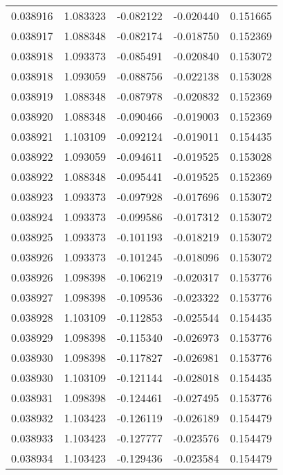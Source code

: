 \begin{tabular}{lrrrr}
0.038916    &  1.083323 & -0.082122 & -0.020440 &             0.151665 \\
0.038917    &  1.088348 & -0.082174 & -0.018750 &             0.152369 \\
0.038918    &  1.093373 & -0.085491 & -0.020840 &             0.153072 \\
0.038918    &  1.093059 & -0.088756 & -0.022138 &             0.153028 \\
0.038919    &  1.088348 & -0.087978 & -0.020832 &             0.152369 \\
0.038920    &  1.088348 & -0.090466 & -0.019003 &             0.152369 \\
0.038921    &  1.103109 & -0.092124 & -0.019011 &             0.154435 \\
0.038922    &  1.093059 & -0.094611 & -0.019525 &             0.153028 \\
0.038922    &  1.088348 & -0.095441 & -0.019525 &             0.152369 \\
0.038923    &  1.093373 & -0.097928 & -0.017696 &             0.153072 \\
0.038924    &  1.093373 & -0.099586 & -0.017312 &             0.153072 \\
0.038925    &  1.093373 & -0.101193 & -0.018219 &             0.153072 \\
0.038926    &  1.093373 & -0.101245 & -0.018096 &             0.153072 \\
0.038926    &  1.098398 & -0.106219 & -0.020317 &             0.153776 \\
0.038927    &  1.098398 & -0.109536 & -0.023322 &             0.153776 \\
0.038928    &  1.103109 & -0.112853 & -0.025544 &             0.154435 \\
0.038929    &  1.098398 & -0.115340 & -0.026973 &             0.153776 \\
0.038930    &  1.098398 & -0.117827 & -0.026981 &             0.153776 \\
0.038930    &  1.103109 & -0.121144 & -0.028018 &             0.154435 \\
0.038931    &  1.098398 & -0.124461 & -0.027495 &             0.153776 \\
0.038932    &  1.103423 & -0.126119 & -0.026189 &             0.154479 \\
0.038933    &  1.103423 & -0.127777 & -0.023576 &             0.154479 \\
0.038934    &  1.103423 & -0.129436 & -0.023584 &             0.154479 \\

\end{tabular}
